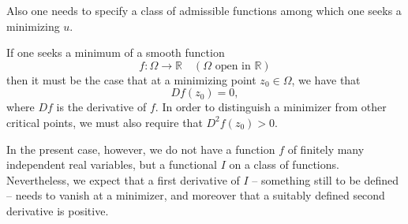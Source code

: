 \documentclass{article}
\theoremstyle{definition}
\theoremstyle{remark}
\theoremstyle{definition}
\begin{document}
    \noindent Also one needs to specify a class of admissible functions among which one seeks a minimizing $u$.\par If one seeks a minimum of a smooth function 
        \begin{equation*}
            f\colon\Omega\rightarrow\mathbb{R}\quad(\Omega\text{ open in }\mathbb{R})
        \end{equation*}
    \noindent then it must be the case that at a minimizing point $z_0\in\Omega$, we have that 
        \begin{equation*}
            Df(z_0)=0,
        \end{equation*}
    \noindent where $Df$ is the derivative of $f$. In order to distinguish a minimizer from other critical points, we must also require that $D^2f(z_0)>0$.\par In the present case, however, we do not have a function $f$ of finitely many independent real variables, but a functional $I$ on a class of functions. Nevertheless, we expect that a first derivative of $I$ -- something still to be defined -- needs to vanish at a minimizer, and moreover that a suitably defined second derivative is positive.
    
\end{document}
